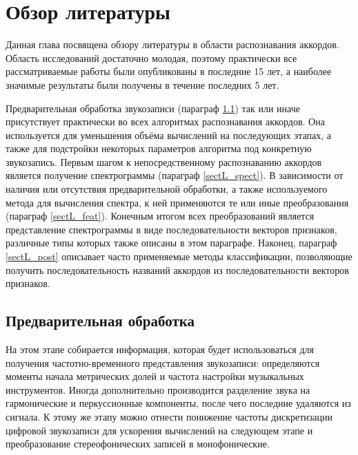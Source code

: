 \chapter{Обзор литературы} \label{chaptL}

Данная глава посвящена обзору литературы в области распознавания аккордов.
Область исследований достаточно молодая, поэтому практически все рассматриваемые
работы были опубликованы в последние 15 лет, а наиболее значимые результаты
были получены в течение последних 5 лет.

Предварительная обработка звукозаписи (параграф \ref{sectL_prelim}) так или
иначе присутствует практически во всех алгоритмах распознавания аккордов. Она
используется для уменьшения объёма вычислений на последующих этапах, а также
для подстройки некоторых параметров алгоритма под конкретную звукозапись. Первым
шагом к непосредственному распознаванию аккордов является получение
спектрограммы (параграф \ref{sectL_spect}). В зависимости от наличия или
отсутствия предварительной обработки, а также используемого метода для
вычисления спектра, к ней применяются те или иные преобразования (параграф
\ref{sectL_feat}). Конечным итогом всех преобразований является представление
спектрограммы в виде последовательности векторов признаков, различные типы
которых также описаны в этом параграфе. Наконец, параграф \ref{sectL_post}
описывает часто применяемые методы классификации, позволяющие получить
последовательность названий аккордов из последовательности векторов признаков.

\section{Предварительная обработка} \label{sectL_prelim}

На этом этапе собирается информация, которая будет использоваться для получения
частотно-временного представления звукозаписи: определяются моменты начала
метрических долей и частота настройки музыкальных инструментов. Иногда
дополнительно производится разделение звука на гармонические и перкуссионные
компоненты, после чего последние удаляются из сигнала. К этому же этапу можно
отнести понижение частоты дискретизации цифровой звукозаписи для ускорения
вычислений на следующем этапе и преобразование стереофонических записей в
монофонические.

